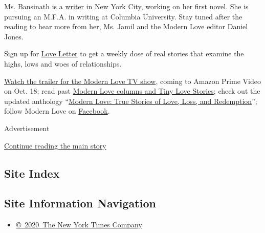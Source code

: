 Ms. Bansinath is a \href{https://www.bindubansinath.com/}{writer} in New
York City, working on her first novel. She is pursuing an M.F.A. in
writing at Columbia University. Stay tuned after the reading to hear
more from her, Ms. Jamil and the Modern Love editor Daniel Jones.

Sign up for \href{https://www.nytimes.com/newsletters/love-letter}{Love
Letter} to get a weekly dose of real stories that examine the highs,
lows and woes of relationships.

\href{https://www.nytimes.com/2019/09/12/style/modern-love-tv-show-trailer.html}{Watch
the trailer for the Modern Love TV show}, coming to Amazon Prime Video
on Oct. 18; read past
\href{https://www.nytimes.com/column/modern-love}{Modern Love columns
and Tiny Love Stories}; check out the updated anthology
``\href{https://www.penguinrandomhouse.com/books/623036/modern-love-revised-and-updated-by-edited-by-daniel-jones-with-contributions-by-andrew-rannells-ayelet-waldman-amy-krouse-rosenthal-veronica-chambers-and-more/}{Modern
Love: True Stories of Love, Loss, and Redemption}''; follow Modern Love
on \href{https://www.facebook.com/modernlove}{Facebook}.

Advertisement

\protect\hyperlink{after-bottom}{Continue reading the main story}

\hypertarget{site-index}{%
\subsection{Site Index}\label{site-index}}

\hypertarget{site-information-navigation}{%
\subsection{Site Information
Navigation}\label{site-information-navigation}}

\begin{itemize}
\tightlist
\item
  \href{https://help.nytimes.com/hc/en-us/articles/115014792127-Copyright-notice}{©~2020~The
  New York Times Company}
\end{itemize}

